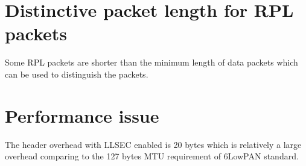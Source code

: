 \section{Distinctive packet length for RPL packets}
Some RPL packets are shorter than the minimum length of data packets which can be used to distinguish the packets.

\section{Performance issue}
The header overhead with LLSEC enabled is 20 bytes which is relatively a large overhead comparing to the 127 bytes MTU requirement of 6LowPAN standard\cite{rfc4944}.